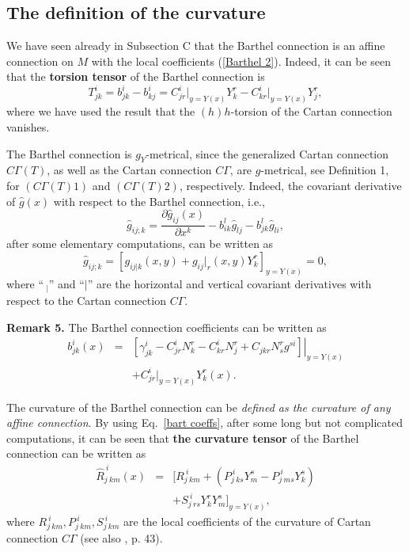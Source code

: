 \documentclass[aps,superscriptaddress, showpacs,preprintnumbers, superscriptaddress, nofootinbibt,twocolumn]{revtex4-2}
\def\bea{\begin{eqnarray}}
\def\eea{\end{eqnarray}}
\begin{document}
\subsection{The definition of the curvature}

We have seen already in Subsection C that the Barthel connection is an affine connection on $M$ with the local coefficients (\ref{Barthel 2}). Indeed, it can be seen that
 the {\bf torsion tensor} of the Barthel connection is
$$
T_{jk}^i=b_{jk}^i-b_{kj}^i=C_{jr}^i\Big|_{y=Y(x)}Y_k^r-C_{kr}^i\Big|_{y=Y(x)}Y_j^r,
$$
where we have used the result that the $(h)h$-torsion of the Cartan connection vanishes.

The Barthel connection is  $g_Y$-metrical, since the generalized Cartan connection $C\Gamma(T)$, as well as the Cartan connection $C\Gamma$, are  $g$-metrical, see  Definition 1, for $(C\Gamma(T)1)$ and  $(C\Gamma(T)2)$, respectively.  Indeed, the covariant derivative of $\hat{g}(x)$ with respect to the Barthel connection, i.e.,
\begin{equation}
  \hat{g}_{ij;k}=\frac{\partial \hat{g}_{ij}(x)}{\partial x^k}-b^l_{ik}\hat{g}_{lj}-b^l_{jk}\hat{g}_{li},
  \end{equation}
after some elementary computations, can be written as
  \begin{equation}
\hat{g}_{ij;k}=  \left[g_{ij|k}(x,y)+g_{ij}|_r(x,y)Y^r_k\right]_{y=Y(x)}=0,
\end{equation}
where ``$\ _|$'' and ``$|$'' are the horizontal and vertical covariant derivatives with
respect to the Cartan connection $C\Gamma$.

{\bf Remark 5.} The Barthel connection coefficients can be written as
\bea\label{bart coeffs}
  b_{jk}^i(x)&=&\left.\left[\gamma_{jk}^i-C_{jr}^iN_k^r-C_{kr}^iN_j^r+C_{jkr}N_s^rg^{si}\right]\right|
  _{y=Y(x)}\nonumber\\
  &&+C_{jr}^i\Big|_{y=Y(x)} Y_k^r(x).
\eea

The curvature of the Barthel connection can be {\it defined as the curvature of any affine connection}. By using Eq.~\eqref{bart coeffs}, after some long but not complicated computations, it can be seen that
{\bf the curvature tensor} of the Barthel connection can be written as
\begin{eqnarray}
\hat{R}^{\ i}_{j\ km}(x)&=&\Bigg[R_{j\ km}^{\ i}+\left(P_{j\ ks}^{\ i}
  Y_m^s-P_{j\ ms}^{\ i}Y_k^s\right)\nonumber\\
 && +S_{j\ rs}^{\ i}Y_k^rY_m^s\Bigg]_{y=Y(x)},
\end{eqnarray}
where $R_{j\ km}^{\ i}, P_{j\ km}^{\ i}, S_{j\ km}^{\ i}$ are the local coefficients of the curvature of Cartan connection $C\Gamma$ (see also \cite{Ing2}, p. 43).
\end{document}
